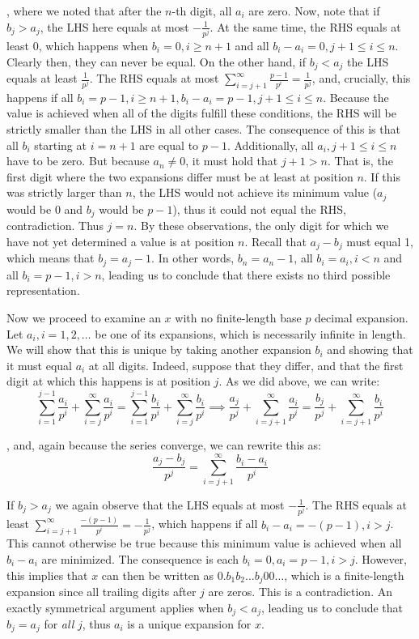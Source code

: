 \begin{solution}
    , where we noted that after the $n$-th digit, all $a_i$ are zero. Now, note that if $b_j > a_j$, the LHS here equals at most $-\frac{1}{p^j}$. At the same time, the RHS equals at least 0, which happens when $b_i = 0, i \geq n+1$ and all $b_i - a_i = 0, j+1 \leq i \leq n$. Clearly then, they can never be equal. On the other hand, if $b_j < a_j$ the LHS equals at least $\frac{1}{p^j}$. The RHS equals at most $\sum_{i=j+1}^{\infty} \frac{p-1}{p^i} = \frac{1}{p^j}$, and, crucially, this happens if all $b_i = p -1, i \geq n+1, b_i - a_i = p -1, j + 1 \leq i \leq n$. Because the value is achieved when all of the digits fulfill these conditions, the RHS will be strictly smaller than the LHS in all other cases. The consequence of this is that all $b_i$ starting at $i=n+1$ are equal to $p-1$. Additionally, all $a_i, j + 1\leq i \leq n$ have to be zero. But because $a_n \neq 0$, it must hold that $j + 1 > n$. That is, the first digit where the two expansions differ must be at least at position $n$. If this was strictly larger than $n$, the LHS would not achieve its minimum value ($a_j$ would be 0 and $b_j$ would be $p-1$), thus it could not equal the RHS, contradiction. Thus $j = n$. By these observations, the only digit for which we have not yet determined a value is at position $n$. Recall that $a_j - b_j$ must equal 1, which means that $b_j = a_j - 1$. In other words, $b_n = a_n - 1$, all $b_i = a_i, i < n$ and all $b_i = p - 1, i > n$, leading us to conclude that there exists no third possible representation.

    Now we proceed to examine an $x$ with no finite-length base $p$ decimal expansion. Let $a_i, i =1, 2, \ldots$ be one of its expansions, which is necessarily infinite in length. We will show that this is unique by taking another expansion $b_i$ and showing that it must equal $a_i$ at all digits. Indeed, suppose that they differ, and that the first digit at which this happens is at position $j$. As we did above, we can write:
    $$\sum_{i=1}^{j-1}\frac{a_i}{p^i} + \sum_{i=j}^{\infty}\frac{a_i}{p^i} = \sum_{i=1}^{j-1}\frac{b_i}{p^i} + \sum_{i=j}^{\infty}\frac{b_i}{p^i} \implies \frac{a_j}{p^j} + \sum_{i=j+1}^{\infty} \frac{a_i}{p^i} = \frac{b_j}{p^j} + \sum_{i=j+1}^{\infty}\frac{b_i}{p^i}$$

    , and, again because the series converge, we can rewrite this as:
    $$\frac{a_j - b_j}{p^j} = \sum_{i=j+1}^{\infty}\frac{b_i - a_i}{p^i}$$

    If $b_j > a_j$ we again observe that the LHS equals at most $-\frac{1}{p^j}$. The RHS equals at least $\sum_{i=j+1}^{\infty}\frac{-(p-1)}{p^i} = -\frac{1}{p^j}$, which happens if all $b_i - a_i = -(p-1), i > j$. This cannot otherwise be true because this minimum value is achieved when all $b_i - a_i$ are minimized. The consequence is each $b_i = 0, a_i = p - 1, i > j$. However, this implies that $x$ can then be written as $0.b_1 b_2 \ldots b_j 0 0 \ldots$, which is a finite-length expansion since all trailing digits after $j$ are zeros. This is a contradiction. An exactly symmetrical argument applies when $b_j < a_j$, leading us to conclude that $b_j = a_j$ for \textit{all} $j$, thus $a_i$ is a unique expansion for $x$.


\end{solution}
